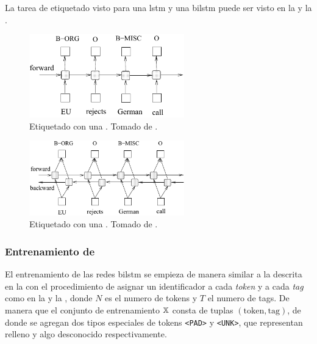 La tarea de etiquetado visto para una \gls{lstm} y una \gls{bilstm} puede ser visto en la  y la .

\begin{figure}[H]
  \centering
  \includegraphics[width=0.6\textwidth]{Figures/lstm-arch.pdf}
\decoRule
\caption[Etiquetado con una ]{Etiquetado con una . Tomado de \cite{Huang2015}.}
\label{fig:lstm-arch}
\end{figure}

\begin{figure}[H]
  \centering
  \includegraphics[width=0.6\textwidth]{Figures/bilstm-arch.pdf}
\decoRule
\caption[Etiquetado con una ]{Etiquetado con una . Tomado de \cite{Huang2015}.}
\label{fig:bilstm-arch}
\end{figure}


\subsubsection{Entrenamiento de }
El entrenamiento de las redes \gls{bilstm} se empieza de manera similar a la descrita en la  con el procedimiento de asignar un identificador a cada \emph{token} y a cada \emph{tag} como en la  y la , donde $N$ es el numero de tokens y $T$ el numero de tags. De manera que el conjunto de entrenamiento ${\mathbb{X}}$ consta de tuplas $(\text{token}, \text{tag})$, de donde se agregan dos tipos especiales de tokens \texttt{<PAD>} y \texttt{<UNK>}, que representan relleno y algo desconocido respectivamente.

